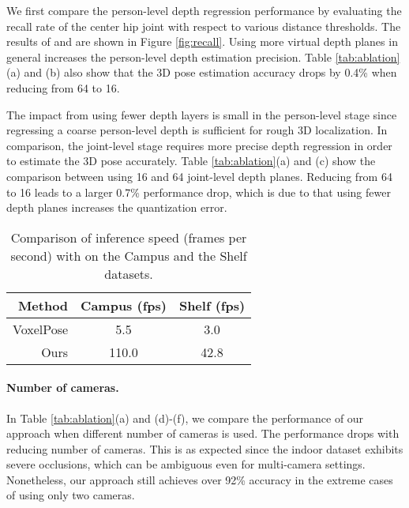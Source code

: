 \documentclass[final]{cvpr}
\begin{document}
We first compare the person-level depth regression performance by evaluating the recall rate of the center hip joint with respect to various distance thresholds.
The results of  and  are shown in Figure \ref{fig:recall}.
Using more virtual depth planes in general increases the person-level depth estimation precision.
Table \ref{tab:ablation}(a) and (b) also show that the 3D pose estimation accuracy drops by 0.4\% when reducing  from 64 to 16.

The impact from using fewer depth layers is small in the person-level stage since regressing a coarse person-level depth is sufficient for rough 3D localization.
In comparison, the joint-level stage requires more precise depth regression in order to estimate the 3D pose accurately.
Table \ref{tab:ablation}(a) and (c) show the comparison between using 16 and 64 joint-level depth planes.
Reducing  from 64 to 16 leads to a larger 0.7\% performance drop, which is due to that using fewer depth planes increases the quantization error.

\begin{table}[t]
    \centering
    \begin{tabular}{r|cc}
        \toprule
        Method & Campus (fps) & Shelf (fps) \\
        \midrule
        \midrule
        VoxelPose \cite{tu2020voxelpose} & 5.5 & 3.0 \\
        Ours & 110.0 & 42.8 \\
        \bottomrule
    \end{tabular}
    \caption{Comparison of inference speed (frames per second) with \cite{tu2020voxelpose} on the Campus and the Shelf datasets.}
    \label{tab:running_time}
    \vspace{-2mm}
\end{table}


\vspace{-3mm} \paragraph{Number of cameras.}
In Table \ref{tab:ablation}(a) and (d)-(f), we compare the performance of our approach when different number of cameras is used.
The performance drops with reducing number of cameras.
This is as expected since the indoor dataset exhibits severe occlusions, which can be ambiguous even for multi-camera settings.
Nonetheless, our approach still achieves over 92\% accuracy in the extreme cases of using only two cameras.
\end{document}
